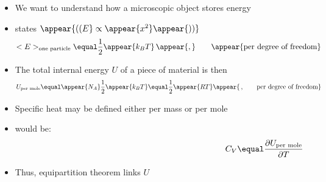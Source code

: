 \begin{frame}%
\frametitle{\texorpdfstring{\culine[\sectiontitleulinecolor]{\sectiontitle}}{\sectiontitle} }

\begin{itemize}[itemsep=1.7mm]
	\item We want to understand how a microscopic object stores energy %
	\item {} states  $ \appear{\textrm{((} E} \propto \appear{x^{2}} \appear{\textrm{))}} $
\[
<E>_{\text{one particle}}  \equal \frac{1}{2} \appear{k_{B} T} \,\appear{,} \qquad \appear{\textrm{per~degree~of~freedom}}
\] 

\item The total internal energy $U$ of a piece of material is then
\[
U_{\text{per mole}}  \equal \appear{N_{A}} \frac{1}{2} \appear{k_{B} T} \equal \frac{1}{2} \appear{R T} \appear{\,, \qquad \textrm{per~degree~of~freedom}}
\]

\item Specific heat may be defined either per mass or per mole

\item {} would be:\vspace{-10mm}
\[
\hspace{8.5cm} C_{V}  \equal \frac{\partial U_{\text {per mole}}}{\partial T}
\]
\item Thus, equipartition theorem links $U$  
\end{itemize}

\endofslide 
\end{frame}

